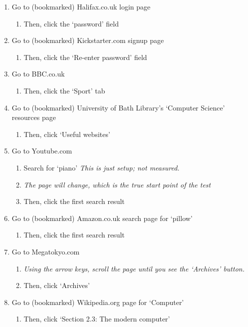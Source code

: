 \documentclass[11pt,openright,a4paper]{report}
\begin{document}
\begin{enumerate}
\item Go to (bookmarked) Halifax.co.uk login page
	\begin{enumerate}
        \item Then, click the `password' field
    \end{enumerate}
	
\item Go to (bookmarked) Kickstarter.com signup page
	\begin{enumerate}
		\item Then, click the `Re-enter password' field
	\end{enumerate}
	
\item Go to BBC.co.uk
	\begin{enumerate}
		\item Then, click the `Sport' tab
	\end{enumerate}

\item Go to (bookmarked) University of Bath Library's `Computer Science' resources page
	\begin{enumerate}
		\item Then, click `Useful websites'
	\end{enumerate}

\item Go to Youtube.com
	\begin{enumerate}
		\item Search for `piano' \textit{This is just setup; not measured.}
		\item \textit{The page will change, which is the true start point of the test}
		\item Then, click the first search result
	\end{enumerate}

\item Go to (bookmarked) Amazon.co.uk search page for `pillow'
	\begin{enumerate}
		\item Then, click the first search result
	\end{enumerate}

\item Go to Megatokyo.com
	\begin{enumerate}
		\item \textit{Using the arrow keys, scroll the page until you see the `Archives' button.}
		\item Then, click `Archives'
	\end{enumerate}

\item Go to (bookmarked) Wikipedia.org page for `Computer'
	\begin{enumerate}
		\item Then, click `Section 2.3: The modern computer'
	\end{enumerate}
\end{enumerate}
\end{document}
